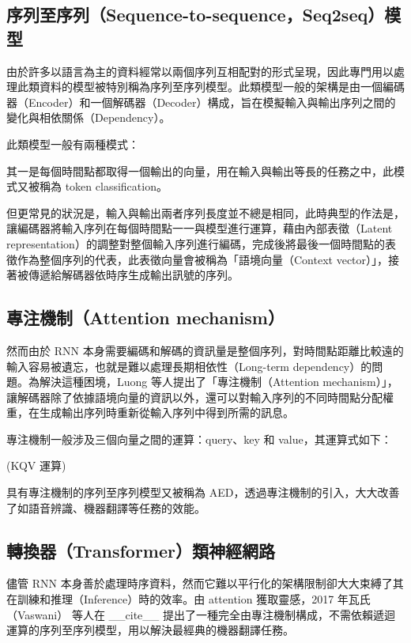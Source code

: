 \subsection{序列至序列（Sequence-to-sequence，Seq2seq）模型}

由於許多以語言為主的資料經常以兩個序列互相配對的形式呈現，因此專門用以處理此類資料的模型被特別稱為序列至序列模型。此類模型一般的架構是由一個編碼器（Encoder）和一個解碼器（Decoder）構成，旨在模擬輸入與輸出序列之間的變化與相依關係（Dependency）。

此類模型一般有兩種模式：

其一是每個時間點都取得一個輸出的向量，用在輸入與輸出等長的任務之中，此模式又被稱為 token classification。

但更常見的狀況是，輸入與輸出兩者序列長度並不總是相同，此時典型的作法是，讓編碼器將輸入序列在每個時間點一一與模型進行運算，藉由內部表徵（Latent representation）的調整對整個輸入序列進行編碼，完成後將最後一個時間點的表徵作為整個序列的代表，此表徵向量會被稱為「語境向量（Context vector）」，接著被傳遞給解碼器依時序生成輸出訊號的序列。

\subsection{專注機制（Attention mechanism）}

然而由於 RNN 本身需要編碼和解碼的資訊量是整個序列，對時間點距離比較遠的輸入容易被遺忘，也就是難以處理長期相依性（Long-term dependency）的問題。為解決這種困境，Luong 等人提出了「專注機制（Attention mechanism）」，讓解碼器除了依據語境向量的資訊以外，還可以對輸入序列的不同時間點分配權重，在生成輸出序列時重新從輸入序列中得到所需的訊息。

專注機制一般涉及三個向量之間的運算：query、key 和 value，其運算式如下：

(KQV 運算)

具有專注機制的序列至序列模型又被稱為 AED，透過專注機制的引入，大大改善了如語音辨識、機器翻譯等任務的效能。

\subsection{轉換器（Transformer）類神經網路}

儘管 RNN 本身善於處理時序資料，然而它難以平行化的架構限制卻大大束縛了其在訓練和推理（Inference）時的效率。由 attention 獲取靈感，2017 年瓦氏（Vaswani） 等人在 \_\_cite\_\_ 提出了一種完全由專注機制構成，不需依賴遞迴運算的序列至序列模型，用以解決最經典的機器翻譯任務。

